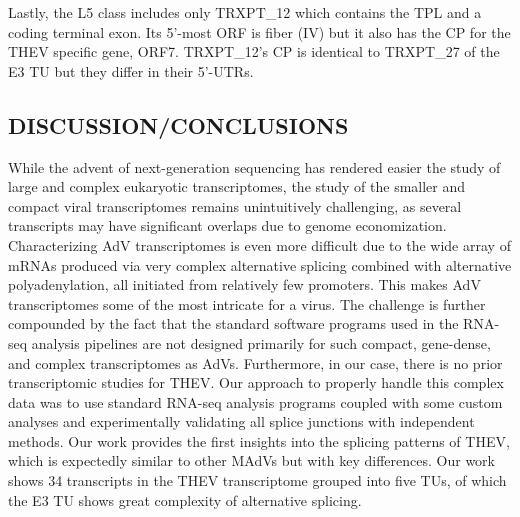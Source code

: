 \documentclass[
]{article}
\begin{document}
Lastly, the L5 class includes only TRXPT\_12 which contains the TPL and
a coding terminal exon. Its 5'-most ORF is fiber (IV) but it also has
the CP for the THEV specific gene, ORF7. TRXPT\_12's CP is identical to
TRXPT\_27 of the E3 TU but they differ in their 5'-UTRs. \newpage

\subsection{DISCUSSION/CONCLUSIONS}\label{discussionconclusions}

While the advent of next-generation sequencing has rendered easier the
study of large and complex eukaryotic transcriptomes, the study of the
smaller and compact viral transcriptomes remains unintuitively
challenging, as several transcripts may have significant overlaps due to
genome economization. Characterizing AdV transcriptomes is even more
difficult due to the wide array of mRNAs produced via very complex
alternative splicing combined with alternative polyadenylation, all
initiated from relatively few promoters. This makes AdV transcriptomes
some of the most intricate for a virus. The challenge is further
compounded by the fact that the standard software programs used in the
RNA-seq analysis pipelines are not designed primarily for such compact,
gene-dense, and complex transcriptomes as AdVs. Furthermore, in our
case, there is no prior transcriptomic studies for THEV. Our approach to
properly handle this complex data was to use standard RNA-seq analysis
programs coupled with some custom analyses and experimentally validating
all splice junctions with independent methods. Our work provides the
first insights into the splicing patterns of THEV, which is expectedly
similar to other MAdVs but with key differences. Our work shows 34
transcripts in the THEV transcriptome grouped into five TUs, of which
the E3 TU shows great complexity of alternative splicing.
\end{document}
